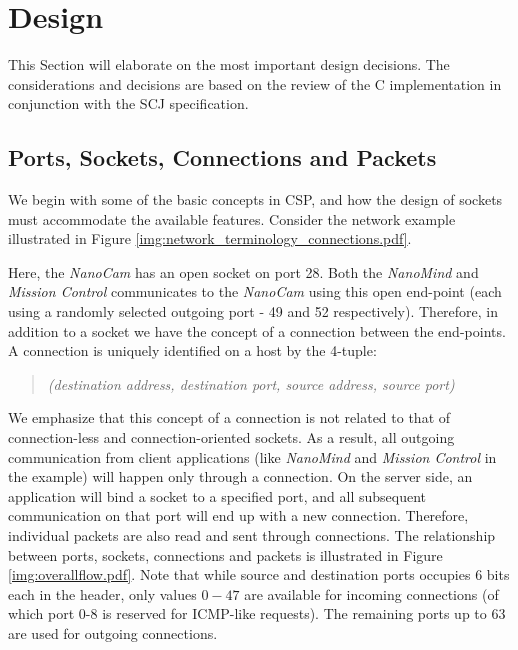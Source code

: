 \section{Design}
This Section will elaborate on the most important design decisions. The considerations and decisions are based on the review of the C implementation in conjunction with the SCJ specification.

\subsection{Ports, Sockets, Connections and Packets}
We begin with some of the basic concepts in CSP, and how the design of sockets must accommodate the available features. Consider the network example illustrated in Figure \ref{img:network_terminology_connections.pdf}. 


Here, the \textit{NanoCam} has an open socket on port 28. Both the \textit{NanoMind} and \textit{Mission Control} communicates to the \textit{NanoCam} using this open end-point (each using a randomly selected outgoing port - 49 and 52 respectively). Therefore, in addition to a socket we have the concept of a connection between the end-points. A connection is uniquely identified on a host by the 4-tuple:

\begin{quotation}
	\emph{(destination address, destination port, source address, source port)}
\end{quotation}

We emphasize that this concept of a connection is not related to that of connection-less and connection-oriented sockets. As a result, all outgoing communication from client applications (like \textit{NanoMind} and \textit{Mission Control} in the example) will happen only through a connection. On the server side, an application will bind a socket to a specified port, and all subsequent communication on that port will end up with a new connection. Therefore, individual packets are also read and sent through connections. The relationship between ports, sockets, connections and packets is illustrated in Figure \ref{img:overallflow.pdf}. Note that while source and destination ports occupies 6 bits each in the header, only values $0-47$ are available for incoming connections (of which port 0-8 is reserved for ICMP-like requests). The remaining ports up to 63 are used for outgoing connections.

